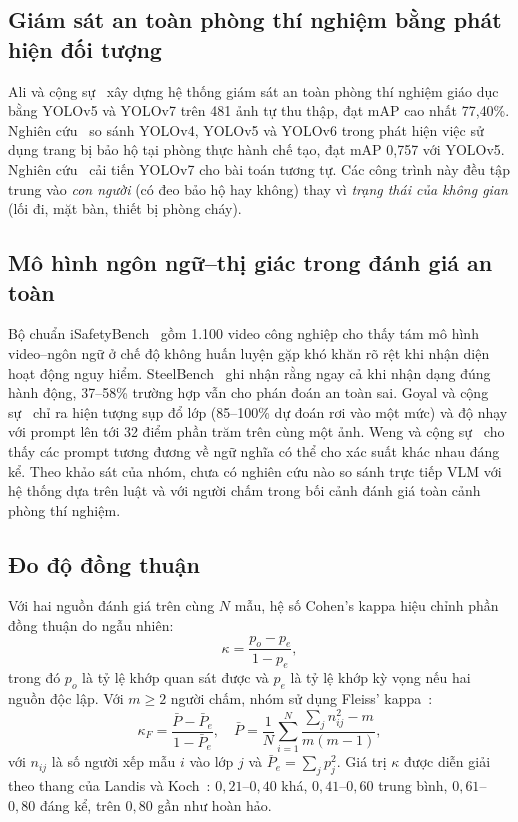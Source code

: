 \documentclass[conference]{IEEEtran}
\begin{document}
\subsection{Giám sát an toàn phòng thí nghiệm bằng phát hiện đối tượng}
Ali và cộng sự~\cite{ali2022yolov5} xây dựng hệ thống giám sát an toàn phòng thí nghiệm giáo dục bằng YOLOv5 và YOLOv7 trên 481 ảnh tự thu thập, đạt mAP cao nhất 77{,}40\%. Nghiên cứu~\cite{ppe2024safety} so sánh YOLOv4, YOLOv5 và YOLOv6 trong phát hiện việc sử dụng trang bị bảo hộ tại phòng thực hành chế tạo, đạt mAP 0{,}757 với YOLOv5. Nghiên cứu~\cite{yolov7ppe2024} cải tiến YOLOv7 cho bài toán tương tự. Các công trình này đều tập trung vào \emph{con người} (có đeo bảo hộ hay không) thay vì \emph{trạng thái của không gian} (lối đi, mặt bàn, thiết bị phòng cháy).

\subsection{Mô hình ngôn ngữ--thị giác trong đánh giá an toàn}
Bộ chuẩn iSafetyBench~\cite{abdullah2025isafetybench} gồm 1.100 video công nghiệp cho thấy tám mô hình video--ngôn ngữ ở chế độ không huấn luyện gặp khó khăn rõ rệt khi nhận diện hoạt động nguy hiểm. SteelBench~\cite{yarrabothula2026steelbench} ghi nhận rằng ngay cả khi nhận dạng đúng hành động, 37--58\% trường hợp vẫn cho phán đoán an toàn sai. Goyal và cộng sự~\cite{goyal2026zeroshot} chỉ ra hiện tượng sụp đổ lớp (85--100\% dự đoán rơi vào một mức) và độ nhạy với prompt lên tới 32 điểm phần trăm trên cùng một ảnh. Weng và cộng sự~\cite{weng2026prompt} cho thấy các prompt tương đương về ngữ nghĩa có thể cho xác suất khác nhau đáng kể. Theo khảo sát của nhóm, chưa có nghiên cứu nào so sánh trực tiếp VLM với hệ thống dựa trên luật và với người chấm trong bối cảnh đánh giá toàn cảnh phòng thí nghiệm.

\subsection{Đo độ đồng thuận}
Với hai nguồn đánh giá trên cùng $N$ mẫu, hệ số Cohen's kappa hiệu chỉnh phần đồng thuận do ngẫu nhiên:
\begin{equation}
  \kappa = \frac{p_o - p_e}{1 - p_e},
  \label{eq:cohen}
\end{equation}
trong đó $p_o$ là tỷ lệ khớp quan sát được và $p_e$ là tỷ lệ khớp kỳ vọng nếu hai nguồn độc lập. Với $m \ge 2$ người chấm, nhóm sử dụng Fleiss' kappa~\cite{fleiss1971}:
\begin{equation}
  \kappa_F = \frac{\bar{P} - \bar{P}_e}{1 - \bar{P}_e},\quad
  \bar{P} = \frac{1}{N}\sum_{i=1}^{N}\frac{\sum_j n_{ij}^2 - m}{m(m-1)},
  \label{eq:fleiss}
\end{equation}
với $n_{ij}$ là số người xếp mẫu $i$ vào lớp $j$ và $\bar{P}_e = \sum_j p_j^2$. Giá trị $\kappa$ được diễn giải theo thang của Landis và Koch~\cite{landis1977}: $0{,}21$--$0{,}40$ khá, $0{,}41$--$0{,}60$ trung bình, $0{,}61$--$0{,}80$ đáng kể, trên $0{,}80$ gần như hoàn hảo.
\end{document}
